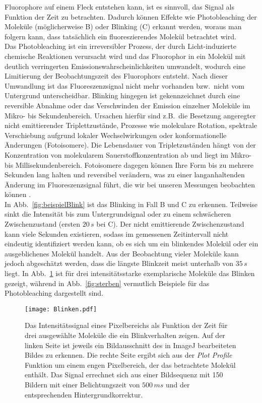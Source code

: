 Fluorophore auf einem Fleck entstehen kann, ist es sinnvoll, das Signal 
als Funktion der Zeit zu betrachten. 
Dadurch können Effekte wie Photobleaching der Moleküle (möglicherweise B) 
oder Blinking (C) erkannt werden, woraus man folgern kann, 
dass tatsächlich ein fluoreszierendes Molekül betrachtet wird. \\
Das Photobleaching ist ein irreversibler Prozess, der durch Licht-induzierte 
chemische Reaktionen verursacht wird und das Fluorophor in ein Molekül mit 
deutlich verringerten Emissionswahrscheinlichkeiten umwandelt, 
wodurch eine Limitierung der Beobachtungszeit des Fluorophors entsteht.
Nach dieser Umwandlung ist das Fluoreszenzsignal nicht mehr vorhanden bzw.~nicht vom 
Untergrund unterscheidbar.
Blinking hingegen ist gekennzeichnet durch eine reversible Abnahme 
oder das Verschwinden der Emission einzelner Moleküle im Mikro- bis Sekundenbereich.
Ursachen hierfür sind z.B.~die Besetzung angeregter nicht emittierender Triplettzustände,
Prozesse wie molekulare Rotation, spektrale Verschiebung aufgrund lokaler 
Wechselwirkungen oder konformationelle Änderungen (Fotoisomere).
Die Lebensdauer von Tripletzuständen hängt von der Konzentration von 
molekularem Sauerstoffkonzentration ab und liegt im Mikro- bis Millisekundenbereich.
Fotoisomere dagegen können Ihre Form bis zu mehrere Sekunden lang halten und reversibel 
verändern, was zu einer langanhaltenden Änderung im Fluoreszenzsignal führt, 
die wir bei unseren Messungen beobachten können \cite{fluo}. \\
In Abb.~\ref{fig:beispielBlink} ist das Blinking in Fall B und C 
zu erkennen. Teilweise sinkt die Intensität bis zum Untergrundsignal 
oder zu einem schwächeren Zwischenzustand (ersten $20\,\si{s}$ bei C). 
Der nicht emittierende Zwischenzustand kann viele Sekunden existieren, 
sodass im gemessenen Zeitintervall nicht eindeutig identifiziert werden kann, 
ob es sich um ein blinkendes Molekül oder ein ausgeblichenes Molekül 
handelt. Aus der Beobachtung vieler Moleküle kann jedoch abgeschätzt werden, 
dass die längste Blinkzeit meist unterhalb von $35\,\si{s}$ liegt.
In Abb.~\ref{fig:blinken} ist für drei intensitätsstarke 
exemplarische Moleküle das Blinken gezeigt, während 
in Abb.~\ref{fig:sterben} vermutlich Beispiele für das Photobleaching
dargestellt sind.
\begin{figure}[h!]
    \centering
    \texttt{[image: Blinken.pdf]}
    \caption{\label{fig:blinken}Das Intensitätssignal eines Pixelbereichs als Funktion
    der Zeit für drei ausgewählte Moleküle die ein Blinkverhalten zeigen. Auf der linken 
    Seite ist jeweils ein Bildausschnitt des in ImageJ bearbeiteten Bildes zu erkennen. 
    Die rechte Seite ergibt sich aus der \textit{Plot Profile} Funktion um einem engen 
    Pixelbereich, der das betrachtete Molekül enthält. Das Signal errechnet sich aus einer 
    Bildsequenz mit 150 Bildern mit einer Belichtungszeit von $500\,\si{ms}$ und der 
    entsprechenden Hintergrundkorrektur.}
\end{figure}\FloatBarrier
